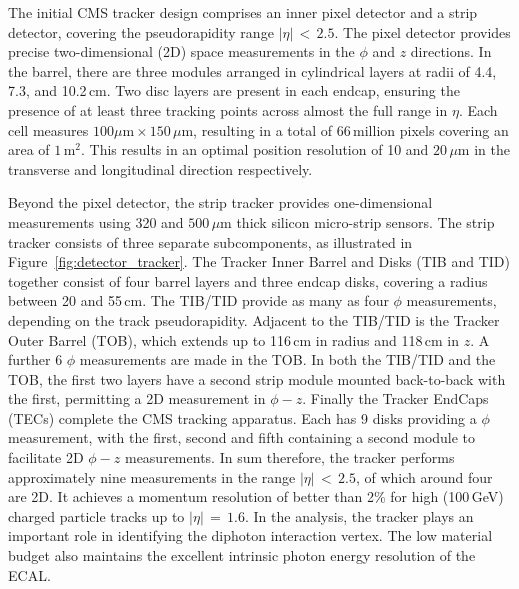 The initial CMS tracker design comprises an inner pixel detector and a strip detector, covering the pseudorapidity range $|\eta|\,<\,2.5$.
The pixel detector provides precise two-dimensional (2D) space measurements in the $\phi$ and $z$ directions.
In the barrel, there are three modules arranged in cylindrical layers at radii of 4.4, 7.3, and 10.2\,cm. 
Two disc layers are present in each endcap, ensuring the presence of at least three tracking points across almost the full range in $\eta$.
Each cell measures $100\mu\textrm{m}\times150\,\mu\textrm{m}$, resulting in a total of 66\,million pixels covering an area of $1\,\textrm{m}^2$.
This results in an optimal position resolution of 10 and $20\,\mu\textrm{m}$ in the transverse and longitudinal direction respectively.

Beyond the pixel detector, the strip tracker provides one-dimensional measurements using 320 and $500\,\mu\textrm{m}$ thick silicon micro-strip sensors.
The strip tracker consists of three separate subcomponents, as illustrated in Figure~\ref{fig:detector_tracker}.
The Tracker Inner Barrel and Disks (TIB and TID) together consist of four barrel layers and three endcap disks, covering a radius between 20 and 55\,cm. %
The TIB/TID provide as many as four $\phi$ measurements, depending on the track pseudorapidity.
Adjacent to the TIB/TID is the Tracker Outer Barrel (TOB), which extends up to 116\,cm in radius and 118\,cm in $z$.
A further 6 $\phi$ measurements are made in the TOB.
In both the TIB/TID and the TOB, the first two layers have a second strip module mounted back-to-back with the first, permitting a 2D measurement in $\phi-z$.
Finally the Tracker EndCaps (TECs) complete the CMS tracking apparatus.
Each has 9 disks providing a $\phi$ measurement, with the first, second and fifth containing a second module to facilitate 2D $\phi-z$ measurements.
In sum therefore, the tracker performs approximately nine measurements in the range $|\eta|\,<\,2.5$, of which around four are 2D.
It achieves a momentum resolution of better than 2\% for high \pt (100\,GeV) charged particle tracks up to $|\eta|\,=\,1.6$. %
In the \Hgg analysis, the tracker plays an important role in identifying the diphoton interaction vertex. %
The low material budget also maintains the excellent intrinsic photon energy resolution of the ECAL.

